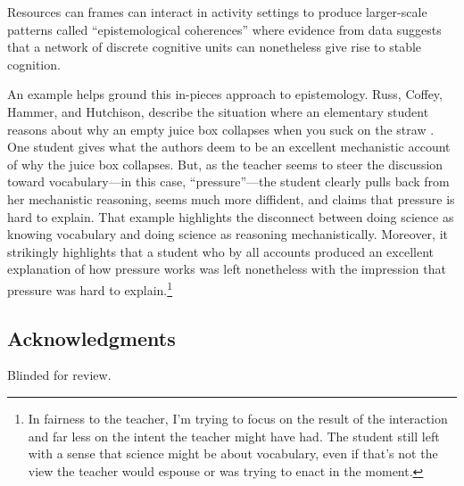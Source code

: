Resources can frames can interact in activity settings to produce
larger-scale patterns called ``epistemological coherences'' \cite{rosenberg_multiple_2006} where evidence from data suggests that a
network of discrete cognitive units can nonetheless give rise to stable
cognition.

An example helps ground this in-pieces approach to epistemology. Russ, Coffey, Hammer, and Hutchison, describe the
situation where an elementary student reasons about why an empty juice
box collapses when you suck on the straw \cite{russ_making_2008}. One student gives what the
authors deem to be an excellent mechanistic account of why the juice box
collapses. But, as the teacher seems to steer the discussion toward
vocabulary---in this case, ``pressure''---the student clearly pulls back
from her mechanistic reasoning, seems much more diffident, and claims
that pressure is hard to explain. That example highlights the disconnect
between doing science as knowing vocabulary and doing science as
reasoning mechanistically. Moreover, it strikingly highlights that a
student who by all accounts produced an excellent explanation of how
pressure works was left nonetheless with the impression that pressure
was hard to explain.\footnote{In fairness to the teacher, I'm trying to
  focus on the result of the interaction and far less on the intent the
  teacher might have had. The student still left with a sense that
  science might be about vocabulary, even if that's not the view the
  teacher would espouse or was trying to enact in the moment.}

\subsection{Acknowledgments}\label{acknowledgments}

Blinded for review.

\clearpage



